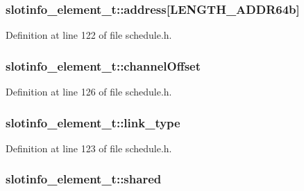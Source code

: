 \subsubsection[{\texorpdfstring{address}{address}}]{ slotinfo\+\_\+element\+\_\+t\+::address\mbox{[}{\bf L\+E\+N\+G\+T\+H\+\_\+\+A\+D\+D\+R64b}\mbox{]}}\hypertarget{structslotinfo__element__t_a01ac4d9ef1f8e8c6af4cefe4ae80d81a}{}\label{structslotinfo__element__t_a01ac4d9ef1f8e8c6af4cefe4ae80d81a}


Definition at line 122 of file schedule.\+h.

\subsubsection[{\texorpdfstring{channel\+Offset}{channelOffset}}]{ slotinfo\+\_\+element\+\_\+t\+::channel\+Offset}\hypertarget{structslotinfo__element__t_ad1ae0d951c110b52d0748a46620a0057}{}\label{structslotinfo__element__t_ad1ae0d951c110b52d0748a46620a0057}


Definition at line 126 of file schedule.\+h.

\subsubsection[{\texorpdfstring{link\+\_\+type}{link_type}}]{ slotinfo\+\_\+element\+\_\+t\+::link\+\_\+type}\hypertarget{structslotinfo__element__t_a5f9179c25d2b344bf30cef3f93973c90}{}\label{structslotinfo__element__t_a5f9179c25d2b344bf30cef3f93973c90}


Definition at line 123 of file schedule.\+h.

\subsubsection[{\texorpdfstring{shared}{shared}}]{ slotinfo\+\_\+element\+\_\+t\+::shared}\hypertarget{structslotinfo__element__t_ac2c954062ccd3ca94ba56d5c50034f36}{}\label{structslotinfo__element__t_ac2c954062ccd3ca94ba56d5c50034f36}


